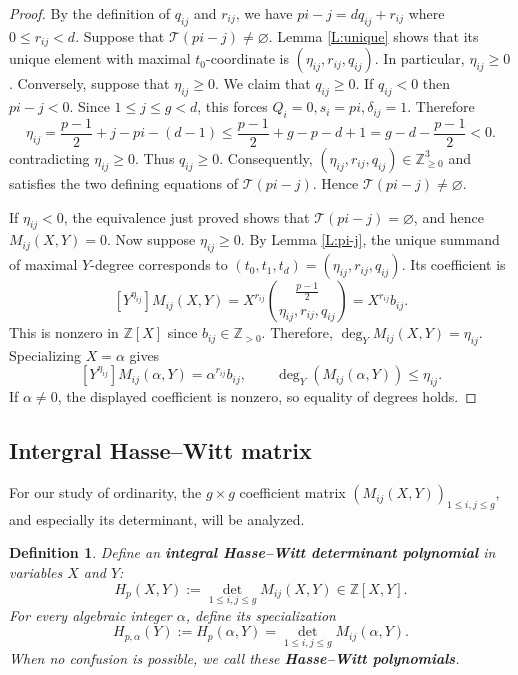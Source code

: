 \documentclass{amsart}
\theoremstyle{plain}
\newtheorem{definition}[theorem]{Definition}
\theoremstyle{remark}
\theoremstyle{remark}
\newcommand{\cT}{\mathcal{T}}
\newcommand{\0}{\mathbf{0}}
\newcommand{\1}{\mathbf{1}}
\newcommand{\Z}{\mathbb{Z}}
\begin{document}
\begin{proof}
By the definition of $q_{ij}$ and $r_{ij}$, we have
$pi-j=dq_{ij}+r_{ij}$ where $0\le r_{ij}<d$.
Suppose that $\cT(pi-j)\ne \varnothing$.
Lemma \ref{L:unique} shows that its unique element with maximal $t_0$-coordinate 
is $(\eta_{ij},r_{ij},q_{ij})$.
In particular, $\eta_{ij}\ge 0$.
Conversely, suppose that $\eta_{ij}\ge 0$. We
claim that $q_{ij}\ge 0$. If $q_{ij}<0$ then $pi-j<0$. Since $1\le j\le g<d$, this forces
$Q_i=0, s_i=pi, \delta_{ij}=1$.
Therefore
$$
\eta_{ij}=\frac{p-1}{2}+j-pi-(d-1)\le \frac{p-1}{2}+g-p-d+1=g-d-\frac{p-1}{2}<0.
$$
contradicting $\eta_{ij}\ge 0$. Thus $q_{ij}\ge 0$.
Consequently, 
$
(\eta_{ij}, r_{ij}, q_{ij})\in\Z^3_{\ge 0}
$
and satisfies the two defining equations of $\cT(pi-j)$. Hence
$\cT(pi-j)\ne \varnothing$. 

If $\eta_{ij}<0$, the equivalence just proved shows that $\cT(pi-j)=\varnothing$, 
and hence 
$M_{ij}(X,Y)=0$.
Now suppose $\eta_{ij}\ge 0$. By Lemma \ref{L:pi-j},
the unique summand of maximal $Y$-degree corresponds to 
$(t_0,t_1,t_d)=(\eta_{ij}, r_{ij}, q_{ij})$.
Its coefficient is  
$$
[Y^{\eta_{ij}}]M_{ij}(X,Y)
=X^{r_{ij}}\binom{\frac{p-1}{2}}{\eta_{ij},r_{ij},q_{ij}}
=X^{r_{ij}}b_{ij}.
$$
This is nonzero in $\Z[X]$ since $b_{ij}\in \Z_{>0}$. 
Therefore, 
$\deg_Y M_{ij}(X,Y)=\eta_{ij}$.
Specializing $X=\alpha$ gives 
$$
[Y^{\eta_{ij}}]M_{ij}(\alpha,Y)=\alpha^{r_{ij}}b_{ij},\qquad
\deg_Y(M_{ij}(\alpha,Y))\le \eta_{ij}.
$$
If $\alpha\ne 0$, the displayed coefficient is nonzero, so equality of degrees holds.
\end{proof}


\subsection{Intergral Hasse--Witt matrix}

For our study of ordinarity, the $g\times g$ coefficient matrix 
$(M_{ij}(X,Y))_{1\le i,j\le g}$, and especially its determinant, will be analyzed. 

\begin{definition}\label{D:polynomial}
Define an {\bf integral Hasse--Witt determinant polynomial} in variables $X$ and $Y$:
$$
H_{p}(X,Y):=\det_{1\le i,j\le g} M_{ij}(X,Y)\in\Z[X,Y].
$$
For every algebraic integer $\alpha$, define its specialization
$$\boxed{H_{p,\alpha}(Y):=H_p(\alpha,Y)=\det_{1\le i,j\le g} M_{ij}(\alpha,Y).}$$
When no confusion is possible, we call these {\bf Hasse--Witt polynomials}.
\end{definition}
\end{document}
